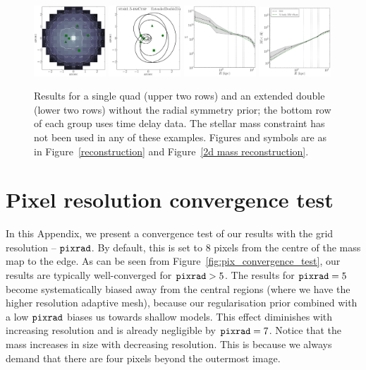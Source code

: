 \documentclass[galley,usenatbib]{mn2e}
\newcommand{\pixrad}{\ensuremath{\mathrm{\tt pixrad}}}
\newcommand{\figref}[1] {Figure~\ref{#1}}
\begin{document}
\begin{figure}
%
\includegraphics[width=0.24\textwidth]{BCExtendedDoubleR1-nosymm_Tms-appendix-a-1.pdf}
\includegraphics[width=0.24\textwidth]{BCExtendedDoubleR1-nosymm_Tms-appendix-b-1.pdf}
\includegraphics[width=0.24\textwidth]{BCExtendedDoubleR1-nosymm_Tms-appendix-c-1.pdf}
\includegraphics[width=0.24\textwidth]{BCExtendedDoubleR1-nosymm_Tms-appendix-d-1.pdf}
\caption{Results for a single quad (upper two rows) and an extended double (lower two rows)
    without the radial symmetry prior; the bottom row of each group uses time delay data. The stellar
    mass constraint has not been used in any of these examples. Figures and symbols are as in \figref{reconstruction} and
    \figref{2d mass reconstruction}.}
\label{fig:no_symm_prior}
\end{figure}

\section{Pixel resolution convergence test}\label{pix_convergence_test}

In this Appendix, we present a convergence test of our results with the grid
resolution -- \pixrad. By default, this is set to 8 pixels from the centre of
the mass map to the edge. As can be seen from
\figref{fig:pix_convergence_test}, our results are typically well-converged for
$\pixrad > 5$. The results for $\pixrad = 5$ become systematically biased away
from the central regions (where we have the higher resolution adaptive mesh),
because our regularisation prior combined with a low \pixrad{} biases us
towards shallow models. This effect diminishes with increasing resolution and
is already negligible by $\pixrad = 7$. Notice that the mass increases in size
with decreasing resolution. This is because we always demand that there are
four pixels beyond the outermost image. 
\end{document}
